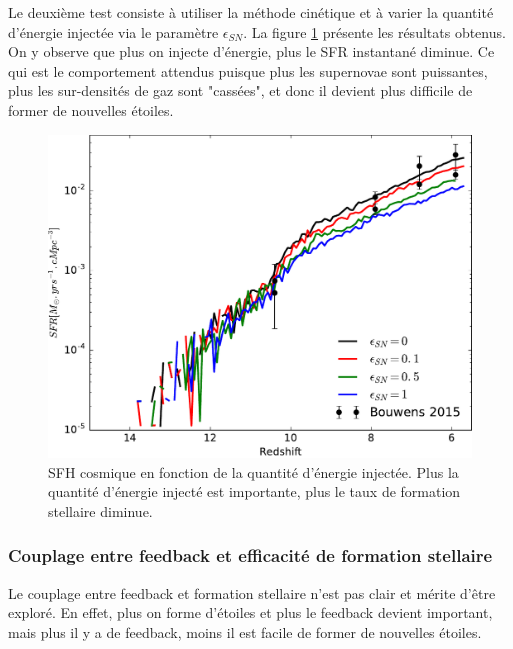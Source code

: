 Le deuxième test consiste à utiliser la méthode cinétique et à varier la quantité d'énergie injectée via le paramètre $\epsilon_{SN}$.
La figure \ref{fig:sfr_egy} présente les résultats obtenus.
On y observe que plus on injecte d'énergie, plus le \ac{SFR} instantané diminue.
Ce qui est le comportement attendus puisque plus les supernovae sont puissantes, plus les sur-densités de gaz sont "cassées", et donc il devient plus difficile de former de nouvelles étoiles.

\begin{figure}
        \includegraphics[width=.95\textwidth]{img/03/sedov/sneff_SFR.pdf} 
        \caption[SFH cosmique en fonction de la quantité d'énergie injectée]{SFH cosmique en fonction de la quantité d'énergie injectée. 
        Plus la quantité d'énergie injecté est importante, plus le taux de formation stellaire diminue.
        }
 		\label{fig:sfr_egy}
\end{figure}

\subsubsection{Couplage entre feedback et efficacité de formation stellaire}

Le couplage entre feedback et formation stellaire n'est pas clair et mérite d'être exploré.
En effet, plus on forme d'étoiles et plus le feedback devient important, mais plus il y a de feedback, moins il est facile de former de nouvelles étoiles.

